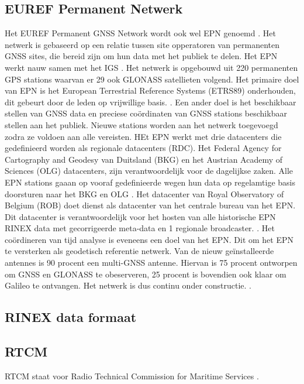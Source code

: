 \subsection{EUREF Permanent Netwerk}
Het EUREF Permanent GNSS Network wordt ook wel EPN genoemd \cite{LBibEPN3,LBibEPN2,LBibEPN}. Het netwerk is gebaseerd op een relatie tussen site opperatoren van permanenten GNSS sites, die bereid zijn om hun data met het publiek te delen. Het EPN werkt nauw samen met het IGS \cite{LBibEPN3}. Het netwerk is opgebouwd uit 220 permanenten GPS stations waarvan er 29 ook GLONASS satellieten volgend. Het primaire doel van EPN is het European Terrestrial Reference Systems (ETRS89) onderhouden, dit gebeurt door de leden op vrijwillige basis. \cite{LBibEPN}  \cite{LBibEPN2}. Een ander doel is het beschikbaar stellen van GNSS data en preciese co\"ordinaten van GNSS stations beschikbaar stellen aan het publiek. Nieuwe stations worden aan het netwerk toegevoegd zodra ze voldoen aan alle vereisten. HEt EPN werkt met drie datacenters die gedefinieerd worden als regionale datacenters (RDC). Het Federal Agency for Cartography and Geodesy van Duitsland (BKG) en het Austrian Academy of Sciences (OLG)  datacenters, zijn verantwoordelijk voor de dagelijkse zaken. Alle EPN stations gaaan op vooraf gedefinieerde wegen hun data op regelamtige basis doorsturen naar het BKG en OLG \cite{LBibEPN2}. Het datacenter van Royal Observatory of Belgium (ROB) doet dienst als datacenter van het centrale bureau van het EPN. Dit datacenter is verantwoordelijk voor het hosten van alle historische EPN RINEX data met gecorrigeerde meta-data en 1 regionale broadcaster. \cite{LBibEPN2,LBibEPN3}. Het co\"ordineren van tijd analyse is eveneens een doel van het EPN. Dit om het EPN te versterken als geodetisch referentie netwerk. Van de nieuw ge\"installeerde antennes is 90 procent een multi-GNSS antenne. Hiervan is 75 procent ontworpen om GNSS en GLONASS te obeserveren, 25 procent is bovendien ook klaar om Galileo te ontvangen. Het netwerk is dus continu onder constructie. \cite{LBibEPN3}.

\subsection{RINEX data formaat}

\subsection{RTCM}
RTCM staat voor Radio Technical Commission for Maritime Services \cite{LBibGLONASS}.

